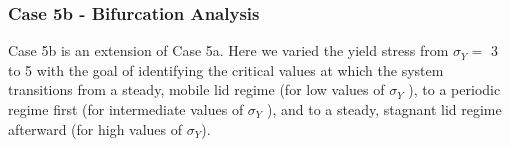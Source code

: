 \subsubsection*{Case 5b - Bifurcation Analysis}

Case 5b is an extension of Case 5a. Here we varied the yield stress from $\sigma_Y=$ 3 to 5 with the goal of identifying 
the critical values at which the system transitions from a steady, mobile lid regime (for low values of $\sigma_Y$ ),
to a periodic regime first (for intermediate values of $\sigma_Y$ ), and to a steady, stagnant lid regime afterward (for
high values of $\sigma_Y$).


